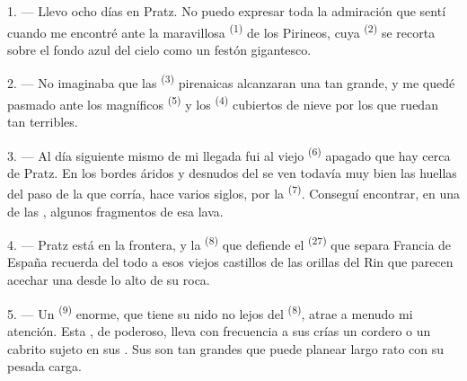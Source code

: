 
\VUsaut{4.0mm}
\VUsaut{3.0mm}

\VUsaut{3.0mm}

\VUsaut{3.0mm}

1. --- Llevo ocho días en Pratz. No puedo expresar toda la admiración que
sentí cuando me encontré ante la maravillosa 
\textsuperscript{(1)} de los Pirineos, cuya  \textsuperscript{(2)} se
recorta sobre el fondo azul del cielo como un festón gigantesco.

2. --- No imaginaba que las  \textsuperscript{(3)} pirenaicas
alcanzaran una  tan grande, y me quedé pasmado ante los
magníficos  \textsuperscript{(5)} y los 
\textsuperscript{(4)} cubiertos de nieve por los que ruedan  tan
terribles.

\VUsaut{3.0mm}
\VUsaut{3.0mm}

3. --- Al día siguiente mismo de mi llegada fui al viejo 
\textsuperscript{(6)} apagado que hay cerca de Pratz. En los bordes áridos y
desnudos del  se ven todavía muy bien las huellas del paso
de la  que corría, hace varios siglos, por la  \textsuperscript{(7)}. Conseguí encontrar, en una de las
, algunos fragmentos de esa lava.

4. --- Pratz está en la frontera, y la  \textsuperscript{(8)} que
defiende el  \textsuperscript{(27)} que separa Francia de España
recuerda del todo a esos viejos castillos de las orillas del Rin que
parecen acechar una  desde lo alto de su roca.

5. --- Un  \textsuperscript{(9)} enorme, que tiene su nido no lejos
del  \textsuperscript{(8)}, atrae a menudo mi atención. Esta
, de  poderoso, lleva con frecuencia a sus
crías un cordero o un cabrito sujeto en sus . Sus
 son tan grandes que puede planear largo rato con su pesada
carga.

